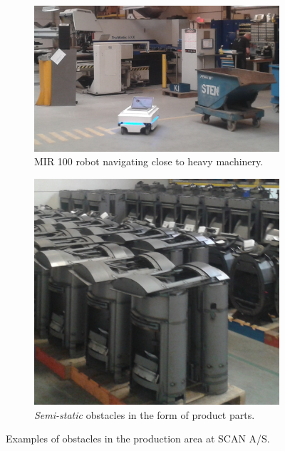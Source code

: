 \begin{figure}[htbp]
	\centering
	\begin{subfigure}[t]{0.6\textwidth}
		\includegraphics[width=1.0\textwidth]{chapters/mapping_of_dynamic_areas/figures/scan-mir}	
		\caption{MIR 100 robot navigating close to heavy machinery.}
		\label{fig:scan-mir}
	\end{subfigure}
	\begin{subfigure}[t]{0.3875\textwidth}
		\includegraphics[width=1.0\textwidth]{chapters/mapping_of_dynamic_areas/figures/scan-semi-static-obstacles}
		\caption{\textit{Semi-static} obstacles in the form of product parts.}
		\label{fig:scan-semi-static-obstacles}
	\end{subfigure}
	\caption{Examples of obstacles in the production area at SCAN A/S.}
\end{figure}

